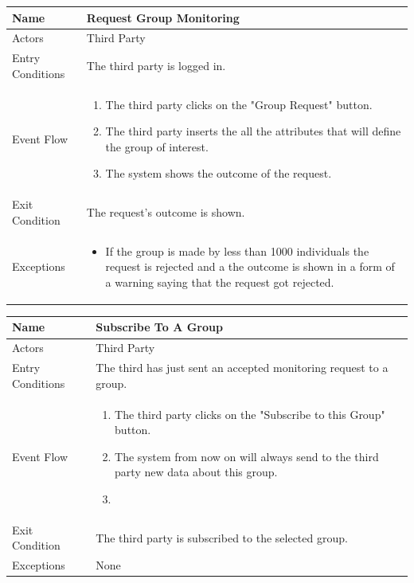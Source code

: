 \begin{enumerate}
\FloatBarrier
\begin{table}[h]
\begin{tabular}{|l|p{}|}
\hline
Name             & Request Group Monitoring \\ \hline
Actors           & Third Party  \\ \hline
Entry Conditions & The third party is logged in.    \\ \hline
Event Flow       & \begin{enumerate}
            \item The third party clicks on the "Group Request" button.
            \item The third party inserts the all the attributes that will define the group of interest.
            \item The system shows the outcome of the request. 
        \end{enumerate}\\ \hline
Exit Condition   & The request's outcome is shown.\\ \hline
Exceptions       & \begin{itemize}
\item If the group is made by less than 1000 individuals the request is rejected and a the outcome is shown in a form of a warning saying that the request got rejected.
\end{itemize}\\ \hline
\end{tabular}
\end{table}
\FloatBarrier

\FloatBarrier
\begin{table}[h]
\begin{tabular}{|l|p{}|}
\hline
Name             & Subscribe To A Group\\ \hline
Actors           & Third Party  \\ \hline
Entry Conditions & The third has just sent an accepted monitoring request to a group. \\ \hline
Event Flow       & \begin{enumerate}
            \item The third party clicks on the "Subscribe to this Group" button.
            \item The system from now on will always send to the third party new data about this group.
            \item 
        \end{enumerate}\\ \hline
Exit Condition   & The third party is subscribed to the selected group.\\ \hline
Exceptions       & None \\ \hline
\end{tabular}
\end{table}
\FloatBarrier



\end{enumerate}
